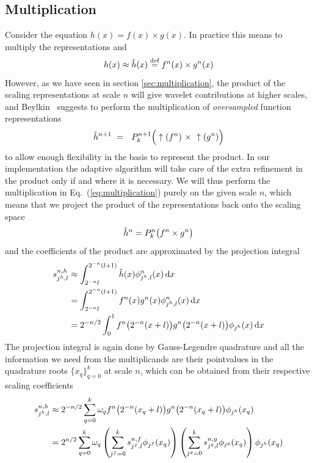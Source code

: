 \subsection{Multiplication}
Consider the equation $h(x) = f(x)\times g(x)$. In practice this means to
multiply the representations  and 
\begin{equation}
    \label{eq:multiplication}
    h(x) \approx \hat{h}(x) \stackrel{\text{def}}{\hbox{=}} {f}^{n}(x) 
	\times {g}^{n}(x)\\
\end{equation}
However, as we have seen in section \ref{sec:multiplication}, the product of the
scaling representations at scale $n$ will give wavelet contributions at higher
scales, and Beylkin~\cite{Beylkin:1992}
suggests to perform the multiplication of \emph{oversampled} function representations 
\begin{equation}
    \scalingrep{\hat{h}}{n+1}\ =\ \ \scalingproj{n+1}\Big( 
	\uparrow(\scalingrep{f}{n})\ \times\ \uparrow(\scalingrep{g}{n}) \Big)
\end{equation}
to allow enough flexibility in the basis to represent the product. In our 
implementation the adaptive algorithm will take care of the extra refinement in the 
product only if and where it is necessary. We will thus perform the multiplication 
in Eq.~(\ref{eq:multiplication}) purely on the given scale $n$, which means that we
project the product of the representations back onto the scaling space 
\begin{equation}
    {\hat{h}}^{n} = 
	{P}_{k}^{n}\big({f}^{n} \times {g}^{n}\big)
\end{equation}
and the coefficients of the product are approximated by the projection integral
\begin{align}
    s^{n,h}_{j^h,l} 
	&\approx \int_{2^{-n}l}^{2^{-n}(l+1)}
	    \hat{h}(x)\phi_{j^h,l}^n(x)\,\mathrm{d} x\\
	&= \int_{2^{-n}l}^{2^{-n}(l+1)}
	    {f}^{n}(x){g}^{n}(x)\phi^n_{j^h,l}(x)\,\mathrm{d} x\\
	&= 2^{-n/2} \int_0^1
	    {f}^{n}\big(2^{-n}(x+l)\big)
	    {g}^{n}\big(2^{-n}(x+l)\big)\phi_{j^h}(x)\,\mathrm{d} x
    \label{eq:multexpansion}
\end{align}
The projection integral is again done by Gauss-Legendre quadrature and all the 
information we need from the multiplicands are their pointvalues in the quadrature 
roots $\lbrace x_q\rbrace_{q=0}^k$ at scale $n$, which can be obtained from their
respective scaling coefficients
\begin{align}
    s^{n,h}_{j^h,l} &\approx 2^{-n/2}
	\sum_{q=0}^k \omega_q {f}^{n}\big(2^{-n}(x_q+l)\big)
        {g}^{n}\big(2^{-n}(x_q+l)\big) \phi_{j^h}(x_q)\\
	&= 2^{n/2}\sum_{q=0}^k \omega_q 
	\left(\sum_{j^f=0}^ks^{n,f}_{j^f,l}\phi_{j^f}(x_q)\right)
	\left(\sum_{j^g=0}^ks^{n,g}_{j^g,l}\phi_{j^g}(x_q)\right)
	\phi_{j^h}(x_q)
	\label{eq:nmult}
\end{align}

